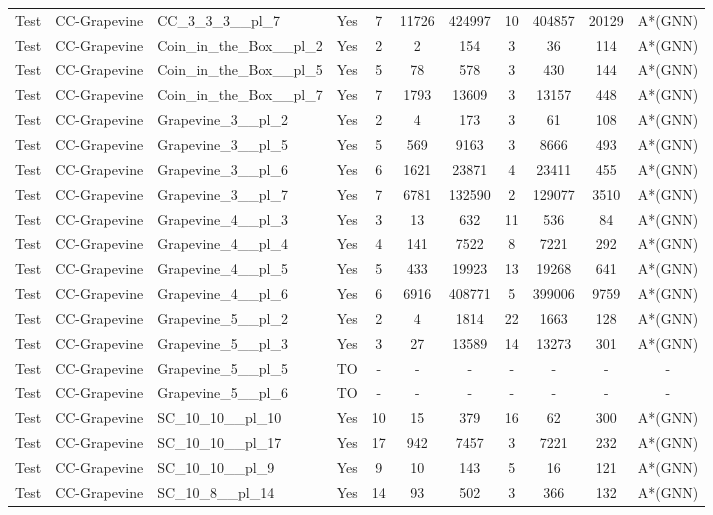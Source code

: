 \documentclass{article}
\begin{document}
\begin{tabular}{lllcccccccc}
Test & CC-Grapevine & CC\_3\_3\_3\_\_pl\_7 & Yes & 7 & 11726 & 424997 & 10 & 404857 & 20129 & A*(GNN) \\
Test & CC-Grapevine & Coin\_in\_the\_Box\_\_pl\_2 & Yes & 2 & 2 & 154 & 3 & 36 & 114 & A*(GNN) \\
Test & CC-Grapevine & Coin\_in\_the\_Box\_\_pl\_5 & Yes & 5 & 78 & 578 & 3 & 430 & 144 & A*(GNN) \\
Test & CC-Grapevine & Coin\_in\_the\_Box\_\_pl\_7 & Yes & 7 & 1793 & 13609 & 3 & 13157 & 448 & A*(GNN) \\
Test & CC-Grapevine & Grapevine\_3\_\_pl\_2 & Yes & 2 & 4 & 173 & 3 & 61 & 108 & A*(GNN) \\
Test & CC-Grapevine & Grapevine\_3\_\_pl\_5 & Yes & 5 & 569 & 9163 & 3 & 8666 & 493 & A*(GNN) \\
Test & CC-Grapevine & Grapevine\_3\_\_pl\_6 & Yes & 6 & 1621 & 23871 & 4 & 23411 & 455 & A*(GNN) \\
Test & CC-Grapevine & Grapevine\_3\_\_pl\_7 & Yes & 7 & 6781 & 132590 & 2 & 129077 & 3510 & A*(GNN) \\
Test & CC-Grapevine & Grapevine\_4\_\_pl\_3 & Yes & 3 & 13 & 632 & 11 & 536 & 84 & A*(GNN) \\
Test & CC-Grapevine & Grapevine\_4\_\_pl\_4 & Yes & 4 & 141 & 7522 & 8 & 7221 & 292 & A*(GNN) \\
Test & CC-Grapevine & Grapevine\_4\_\_pl\_5 & Yes & 5 & 433 & 19923 & 13 & 19268 & 641 & A*(GNN) \\
Test & CC-Grapevine & Grapevine\_4\_\_pl\_6 & Yes & 6 & 6916 & 408771 & 5 & 399006 & 9759 & A*(GNN) \\
Test & CC-Grapevine & Grapevine\_5\_\_pl\_2 & Yes & 2 & 4 & 1814 & 22 & 1663 & 128 & A*(GNN) \\
Test & CC-Grapevine & Grapevine\_5\_\_pl\_3 & Yes & 3 & 27 & 13589 & 14 & 13273 & 301 & A*(GNN) \\
Test & CC-Grapevine & Grapevine\_5\_\_pl\_5 & TO & - & - & - & - & - & - & - \\
Test & CC-Grapevine & Grapevine\_5\_\_pl\_6 & TO & - & - & - & - & - & - & - \\
Test & CC-Grapevine & SC\_10\_10\_\_pl\_10 & Yes & 10 & 15 & 379 & 16 & 62 & 300 & A*(GNN) \\
Test & CC-Grapevine & SC\_10\_10\_\_pl\_17 & Yes & 17 & 942 & 7457 & 3 & 7221 & 232 & A*(GNN) \\
Test & CC-Grapevine & SC\_10\_10\_\_pl\_9 & Yes & 9 & 10 & 143 & 5 & 16 & 121 & A*(GNN) \\
Test & CC-Grapevine & SC\_10\_8\_\_pl\_14 & Yes & 14 & 93 & 502 & 3 & 366 & 132 & A*(GNN) \\

\end{tabular}
\end{document}
